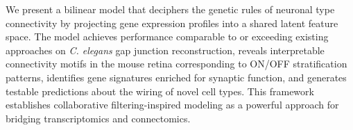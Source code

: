 \documentclass[11pt]{article}
\begin{document}
We present a bilinear model that deciphers the genetic rules of neuronal type connectivity by projecting gene expression profiles into a shared latent feature space. The model achieves performance comparable to or exceeding existing approaches on \textit{C. elegans} gap junction reconstruction, reveals interpretable connectivity motifs in the mouse retina corresponding to ON/OFF stratification patterns, identifies gene signatures enriched for synaptic function, and generates testable predictions about the wiring of novel cell types. This framework establishes collaborative filtering-inspired modeling as a powerful approach for bridging transcriptomics and connectomics.



\end{document}
